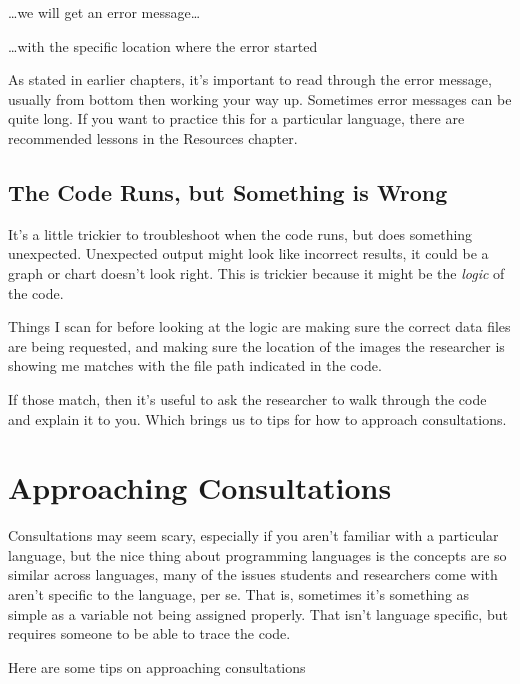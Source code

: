 \documentclass[
]{book}
\begin{document}
\ldots we will get an error message\ldots{}

\ldots with the specific location where the error started

As stated in earlier chapters, it's important to read through the error message,
usually from bottom then working your way up. Sometimes error messages can be
quite long. If you want to practice this for a particular
language, there are recommended lessons in the Resources chapter.

\subsection{The Code Runs, but Something is Wrong}\label{the-code-runs-but-something-is-wrong}

It's a little trickier to troubleshoot when the code runs, but does something
unexpected. Unexpected output might look like incorrect results, it could be a
graph or chart doesn't look right. This is trickier because it might be the
\emph{logic} of the code.

Things I scan for before looking at the logic are making sure the correct data files
are being requested, and making sure the location of the images the researcher is
showing me matches with the file path indicated in the code.

If those match, then it's useful to ask the researcher to walk through the code
and explain it to you. Which brings us to tips for how to approach consultations.

\section{Approaching Consultations}\label{approaching-consultations}

Consultations may seem scary, especially if you aren't familiar with a particular language, but the nice thing about programming languages is the concepts are so similar across languages, many of the issues students and researchers come with aren't specific to the language, per se. That is, sometimes it's something as simple as a variable not being assigned properly. That isn't language specific, but requires someone to be able to trace the code.

Here are some tips on approaching consultations
\end{document}
